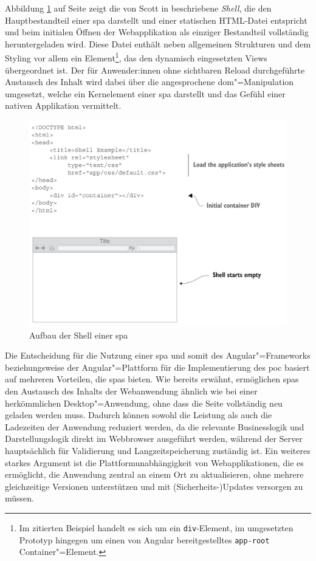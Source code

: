 \documentclass[a4paper,12pt,twoside]{scrreprt}
\begin{document}
Abbildung \ref{fig:scott-spa-shell} auf Seite \pageref{fig:scott-spa-shell} zeigt die von Scott in \cite{scott_spa_2015} beschriebene \textit{Shell}, die den Hauptbestandteil einer \ac{spa} darstellt und  einer statischen HTML-Datei entspricht und beim initialen Öffnen der Webapplikation als einziger Bestandteil vollständig heruntergeladen wird. Diese Datei enthält neben allgemeinen Strukturen und dem Styling vor allem ein Element\footnote{Im zitierten Beispiel handelt es sich um ein \texttt{div}-Element, im umgesetzten Prototyp hingegen um einen von Angular bereitgestelltes \texttt{app-root} Container"=Element.}, das den dynamisch eingesetzten Views übergeordnet ist. Der für Anwender:innen ohne sichtbaren Reload durchgeführte Austausch des Inhalt wird dabei über die angesprochene \ac{dom}"=Manipulation umgesetzt, welche ein Kernelement einer \ac{spa} darstellt und das Gefühl einer nativen Applikation vermittelt. \cite[8, 10\psqq]{scott_spa_2015}

\begin{figure}[ht]
    \centering
    \includegraphics[width=.8\linewidth]{thesis/images/Scott_SPA-Shell.png}
    \caption[Aufbau der Shell einer \acs{spa}]{Aufbau der Shell einer \acs{spa} \cite[8]{scott_spa_2015}}
    \label{fig:scott-spa-shell}
\end{figure}

Die Entscheidung für die Nutzung einer \ac{spa} und somit des Angular"=Frameworks beziehungsweise der Angular"=Plattform für die Implementierung des \ac{poc} basiert auf mehreren Vorteilen, die \acp{spa} bieten. Wie bereits erwähnt, ermöglichen \acp{spa} den Austausch des Inhalts der Webanwendung ähnlich wie bei einer herkömmlichen Desktop"=Anwendung, ohne dass die Seite vollständig neu geladen werden muss. Dadurch können sowohl die Leistung als auch die Ladezeiten der Anwendung reduziert werden, da die relevante Businesslogik und Darstellungslogik direkt im Webbrowser ausgeführt werden, während der Server hauptsächlich für Validierung und Langzeitspeicherung zuständig ist. Ein weiteres starkes Argument ist die Plattformunabhängigkeit von Webapplikationen, die es ermöglicht, die Anwendung zentral an einem Ort zu aktualisieren, ohne mehrere gleichzeitige Versionen unterstützen und mit (Sicherheits-)Updates versorgen zu müssen. \cite[20\psq]{mikowski_single_2013}
\end{document}
